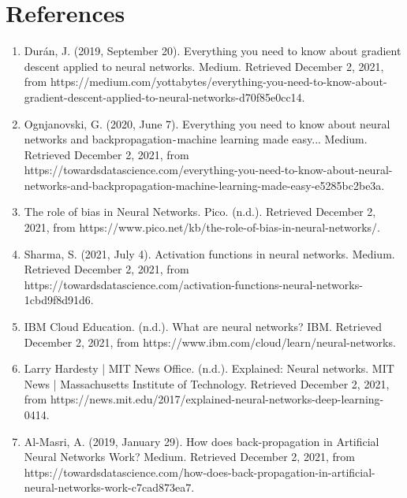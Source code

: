 \documentclass[twoside,twocolumn]{article}
\begin{document}
 \section{References}
 \begin{scriptsize}
 \begin{enumerate}
    \item Durán, J. (2019, September 20). Everything you need to know about gradient descent applied to neural networks. Medium. Retrieved December 2, 2021, from https://medium.com/yottabytes/everything-you-need-to-know-about-gradient-descent-applied-to-neural-networks-d70f85e0cc14. \\
 
    \item Ognjanovski, G. (2020, June 7). Everything you need to know about neural networks and backpropagation - machine learning made easy... Medium. Retrieved December 2, 2021, from https://towardsdatascience.com/everything-you-need-to-know-about-neural-networks-and-backpropagation-machine-learning-made-easy-e5285bc2be3a. \\

    \item The role of bias in Neural Networks. Pico. (n.d.). Retrieved December 2, 2021, from https://www.pico.net/kb/the-role-of-bias-in-neural-networks/. \\
    
    \item Sharma, S. (2021, July 4). Activation functions in neural networks. Medium. Retrieved December 2, 2021, from https://towardsdatascience.com/activation-functions-neural-networks-1cbd9f8d91d6. \\
    
    \item IBM Cloud Education. (n.d.). What are neural networks? IBM. Retrieved December 2, 2021, from https://www.ibm.com/cloud/learn/neural-networks. \\
    
    \item Larry Hardesty | MIT News Office. (n.d.). Explained: Neural networks. MIT News | Massachusetts Institute of Technology. Retrieved December 2, 2021, from https://news.mit.edu/2017/explained-neural-networks-deep-learning-0414. \\
    
    \item Al-Masri, A. (2019, January 29). How does back-propagation in Artificial Neural Networks Work? Medium. Retrieved December 2, 2021, from https://towardsdatascience.com/how-does-back-propagation-in-artificial-neural-networks-work-c7cad873ea7. \\
    

\end{enumerate}
\end{scriptsize}
\end{document}
